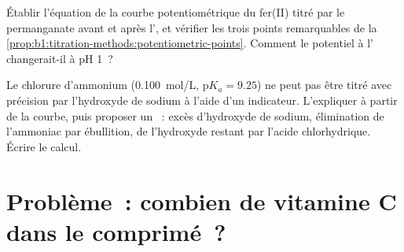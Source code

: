 \begin{exercise}[$\star\star\star$]\label{exo:b1:titration-methods:11}
Établir l'équation de la courbe potentiométrique du fer(II) titré par le
permanganate avant et après l', et vérifier les trois points
remarquables de la \cref{prop:b1:titration-methods:potentiometric-points}.
Comment le potentiel à l' changerait-il à pH 1~?
\end{exercise}

\begin{exercise}[$\star\star\star$]\label{exo:b1:titration-methods:12}
Le chlorure d'ammonium (\qty{0.100}{mol/L}, $\mathrm{p}K_a = 9.25$) ne
peut pas être titré avec précision par l'hydroxyde de sodium à l'aide
d'un indicateur. L'expliquer à partir de la courbe, puis proposer un
~: excès d'hydroxyde de sodium, élimination de
l'ammoniac par ébullition,  de l'hydroxyde restant par l'acide
chlorhydrique. Écrire le calcul.
\end{exercise}

\section{Problème~: combien de vitamine C dans le comprimé~?}

